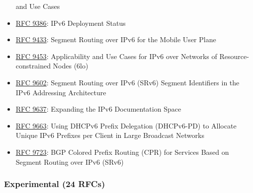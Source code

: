 \documentclass[
]{article}
\begin{document}
\begin{itemize}
  and Use Cases
\item
  \href{https://www.rfc-editor.org/info/rfc9386}{RFC 9386}: IPv6
  Deployment Status
\item
  \href{https://www.rfc-editor.org/info/rfc9433}{RFC 9433}: Segment
  Routing over IPv6 for the Mobile User Plane
\item
  \href{https://www.rfc-editor.org/info/rfc9453}{RFC 9453}:
  Applicability and Use Cases for IPv6 over Networks of
  Resource-constrained Nodes (6lo)
\item
  \href{https://www.rfc-editor.org/info/rfc9602}{RFC 9602}: Segment
  Routing over IPv6 (SRv6) Segment Identifiers in the IPv6 Addressing
  Architecture
\item
  \href{https://www.rfc-editor.org/info/rfc9637}{RFC 9637}: Expanding
  the IPv6 Documentation Space
\item
  \href{https://www.rfc-editor.org/info/rfc9663}{RFC 9663}: Using DHCPv6
  Prefix Delegation (DHCPv6-PD) to Allocate Unique IPv6 Prefixes per
  Client in Large Broadcast Networks
\item
  \href{https://www.rfc-editor.org/info/rfc9723}{RFC 9723}: BGP Colored
  Prefix Routing (CPR) for Services Based on Segment Routing over IPv6
  (SRv6)
\end{itemize}

\subsubsection{Experimental (24 RFCs)}\label{experimental-24-rfcs}
\end{document}
